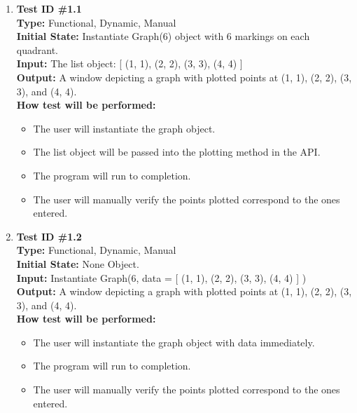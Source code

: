 \documentclass[12pt, titlepage]{article}
\begin{document}
		\begin{enumerate}
			\item{\textbf{Test ID \#1.1\\}}
			\textbf{Type:} Functional, Dynamic, Manual\\
			\textbf{Initial State:} Instantiate Graph(6) object with 6 markings on each quadrant.\\
			\textbf{Input:} The list object: [ (1, 1),  (2, 2), (3, 3), (4, 4) ]\\
			\textbf{Output:} A window depicting a graph with plotted points at (1, 1), (2, 2), (3, 3), and (4, 4). \\
			\textbf{How test will be performed:}
				\begin{itemize}[label={--}]
					\item The user will instantiate the graph object.
					\item The list object will be passed into the plotting method in the API.
					\item The program will run to completion.
					\item The user will manually verify the points plotted correspond to the ones entered.
				\end{itemize}
					
			\item{\textbf{Test ID \#1.2\\}}
			\textbf{Type:} Functional, Dynamic, Manual\\
			\textbf{Initial State:} None Object.\\
			\textbf{Input:} Instantiate Graph(6, data = [ (1, 1),  (2, 2), (3, 3), (4, 4) ] )\\
			\textbf{Output:} A window depicting a graph with plotted points at (1, 1), (2, 2), (3, 3), and (4, 4). \\
			\textbf{How test will be performed:}
				\begin{itemize}[label={--}]
					\item The user will instantiate the graph object with data immediately.
					\item The program will run to completion.
					\item The user will manually verify the points plotted correspond to the ones entered.
				\end{itemize}
				

\end{enumerate}
\end{document}

